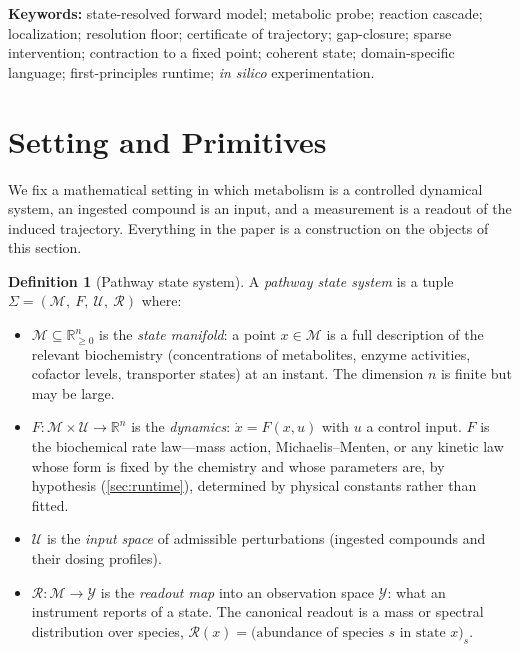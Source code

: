 \documentclass[11pt,a4paper]{article}
\theoremstyle{thmstyle}
\theoremstyle{definition}
\newtheorem{definition}[theorem]{Definition}
\theoremstyle{remark}
\newcommand{\R}{\mathbb{R}}
\newcommand{\Rp}{\R_{\ge 0}}
\newcommand{\Man}{\mathcal{M}}          %
\newcommand{\st}{x}                     %
\newcommand{\fld}{F}                    %
\newcommand{\Rd}{\mathcal{R}}           %
\newcommand{\intv}{u}                   %
\begin{document}
\vspace{4pt}
\noindent\textbf{Keywords:} state-resolved forward model; metabolic probe;
reaction cascade; localization; resolution floor; certificate of trajectory;
gap-closure; sparse intervention; contraction to a fixed point; coherent
state; domain-specific language; first-principles runtime; \emph{in silico}
experimentation.

\tableofcontents

\section{Setting and Primitives}
\label{sec:setting}

We fix a mathematical setting in which metabolism is a controlled
dynamical system, an ingested compound is an input, and a measurement is
a readout of the induced trajectory. Everything in the paper is a
construction on the objects of this section.

\begin{definition}[Pathway state system]
\label{def:system}
A \emph{pathway state system} is a tuple
$\Sigma=(\Man,\ \fld,\ \mathcal{U},\ \Rd)$ where:
\begin{itemize}[leftmargin=1.4em,itemsep=2pt]
\item $\Man\subseteq\Rp^{n}$ is the \emph{state manifold}: a point
$\st\in\Man$ is a full description of the relevant biochemistry
(concentrations of metabolites, enzyme activities, cofactor levels,
transporter states) at an instant. The dimension $n$ is finite but may be
large.
\item $\fld\colon\Man\times\mathcal{U}\to\R^{n}$ is the \emph{dynamics}:
$\dot\st=\fld(\st,\intv)$ with $\intv$ a control input. $\fld$ is the
biochemical rate law---mass action, Michaelis--Menten, or any kinetic law
whose form is fixed by the chemistry and whose parameters are, by
hypothesis (\cref{sec:runtime}), determined by physical constants rather
than fitted.
\item $\mathcal{U}$ is the \emph{input space} of admissible perturbations
(ingested compounds and their dosing profiles).
\item $\Rd\colon\Man\to\mathcal{Y}$ is the \emph{readout map} into an
observation space $\mathcal{Y}$: what an instrument reports of a state.
The canonical readout is a mass or spectral distribution over species,
$\Rd(\st)=\bigl(\text{abundance of species } s \text{ in state } \st\bigr)_{s}$.
\end{itemize}
\end{definition}
\end{document}
